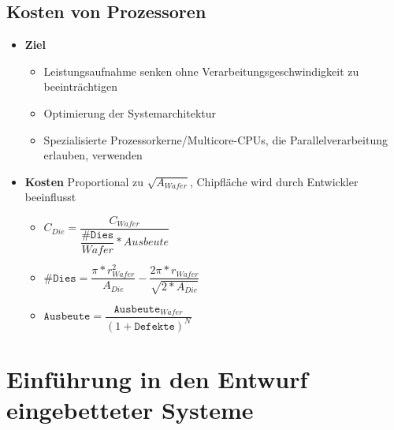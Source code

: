 \subsection{Kosten von Prozessoren}
\begin{itemize}
	\item \textbf{Ziel}
	\begin{itemize}
		\item Leistungsaufnahme senken ohne Verarbeitungsgeschwindigkeit zu beeinträchtigen
		\item Optimierung der Systemarchitektur
		\item Spezialisierte Prozessorkerne/Multicore-CPUs, die Parallelverarbeitung erlauben, verwenden
	\end{itemize}
	\item \textbf{Kosten} Proportional zu $\sqrt{A_{Wafer}}$, Chipfläche wird durch Entwickler beeinflusst
	\begin{itemize}
		\item $C_{Die}=\dfrac{C_{Wafer}}{\dfrac{\texttt{\#Dies}}{Wafer}*Ausbeute}$
		\item $\texttt{\#Dies}=\dfrac{\pi*r_{Wafer}^2}{A_{Die}}-\dfrac{2\pi*r_{Wafer}}{\sqrt{2*A_{Die}}}$
		\item $\texttt{Ausbeute}=\dfrac{\texttt{Ausbeute}_{Wafer}}{(1+\texttt{Defekte})^N}$
	\end{itemize}
\end{itemize}

\section{Einführung in den Entwurf eingebetteter Systeme}

